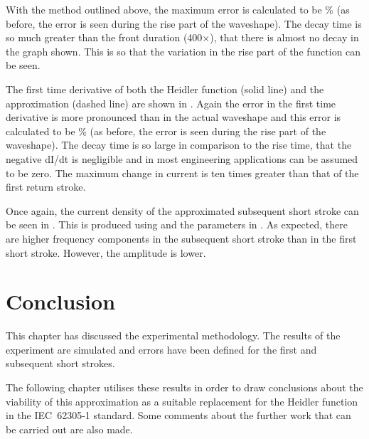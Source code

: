With the method outlined above, the maximum error is calculated to be \unskip \% (as before, the error is seen during the rise part of the waveshape). The decay time is so much greater than the front duration (400$\times$), that there is almost no decay in the graph shown. This is so that the variation in the rise part of the function can be seen.

The first time derivative of both the Heidler function (solid line) and the approximation (dashed line) are shown in .
Again the error in the first time derivative is more pronounced than in the actual waveshape and this error is calculated to be \unskip \% (as before, the error is seen during the rise part of the waveshape). The decay time is so large in comparison to the rise time, that the negative dI/dt is negligible and in most engineering applications can be assumed to be zero. The maximum change in current is ten times greater than that of the first return stroke.

Once again, the current density of the approximated subsequent short stroke can be seen in . This is produced using  and the parameters in .
As expected, there are higher frequency components in the subsequent short stroke than in the first short stroke. However, the amplitude is lower.


\section{Conclusion}
\label{sec:results_conclusion}
This chapter has discussed the experimental methodology. The results of the experiment are simulated and errors have been defined for the first and subsequent short strokes.

The following chapter utilises these results in order to draw conclusions about the viability of this approximation as a suitable replacement for the Heidler function in the IEC~62305-1 standard. Some comments about the further work that can be carried out are also made.
